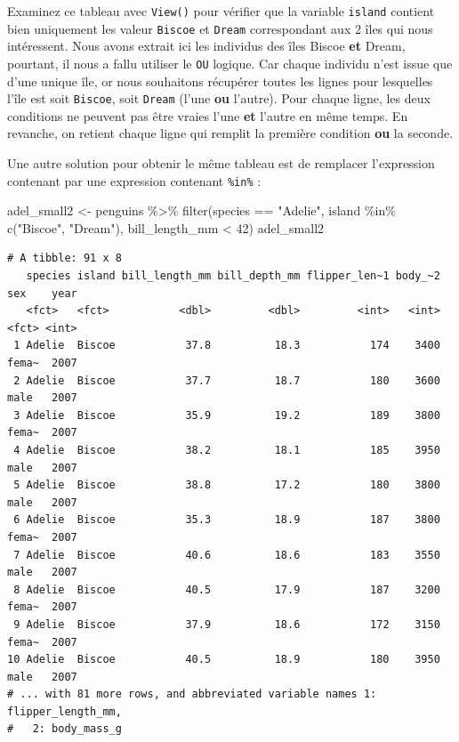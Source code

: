 \documentclass[
  letterpaper,
  DIV=11,
  numbers=noendperiod]{scrreprt}
\newenvironment{Shaded}{\begin{snugshade}}{\end{snugshade}}
\newcommand{\DecValTok}[1]{\textcolor[rgb]{0.68,0.00,0.00}{#1}}
\newcommand{\FunctionTok}[1]{\textcolor[rgb]{0.28,0.35,0.67}{#1}}
\newcommand{\NormalTok}[1]{\textcolor[rgb]{0.00,0.23,0.31}{#1}}
\newcommand{\OtherTok}[1]{\textcolor[rgb]{0.00,0.23,0.31}{#1}}
\newcommand{\SpecialCharTok}[1]{\textcolor[rgb]{0.37,0.37,0.37}{#1}}
\newcommand{\StringTok}[1]{\textcolor[rgb]{0.13,0.47,0.30}{#1}}
\begin{document}
Examinez ce tableau avec \texttt{View()} pour vérifier que la variable
\texttt{island} contient bien uniquement les valeur \texttt{Biscoe} et
\texttt{Dream} correspondant aux 2 îles qui nous intéressent. Nous avons
extrait ici les individus des îles Biscoe \textbf{et} Dream, pourtant,
il nous a fallu utiliser le \texttt{OU} logique. Car chaque individu
n'est issue que d'une unique île, or nous souhaitons récupérer toutes
les lignes pour lesquelles l'île est soit \texttt{Biscoe}, soit
\texttt{Dream} (l'une \textbf{ou} l'autre). Pour chaque ligne, les deux
conditions ne peuvent pas être vraies l'une \textbf{et} l'autre en même
temps. En revanche, on retient chaque ligne qui remplit la première
condition \textbf{ou} la seconde.

Une autre solution pour obtenir le même tableau est de remplacer
l'expression contenant \texttt{\textbar{}} par une expression contenant
\texttt{\%in\%} :

\begin{Shaded}
\begin{Highlighting}[]
\NormalTok{adel\_small2 }\OtherTok{\textless{}{-}}\NormalTok{ penguins }\SpecialCharTok{\%\textgreater{}\%} 
  \FunctionTok{filter}\NormalTok{(species }\SpecialCharTok{==} \StringTok{"Adelie"}\NormalTok{, }
\NormalTok{         island }\SpecialCharTok{\%in\%} \FunctionTok{c}\NormalTok{(}\StringTok{"Biscoe"}\NormalTok{, }\StringTok{"Dream"}\NormalTok{), }
\NormalTok{         bill\_length\_mm }\SpecialCharTok{\textless{}} \DecValTok{42}\NormalTok{)}
\NormalTok{adel\_small2}
\end{Highlighting}
\end{Shaded}

\begin{verbatim}
# A tibble: 91 x 8
   species island bill_length_mm bill_depth_mm flipper_len~1 body_~2 sex    year
   <fct>   <fct>           <dbl>         <dbl>         <int>   <int> <fct> <int>
 1 Adelie  Biscoe           37.8          18.3           174    3400 fema~  2007
 2 Adelie  Biscoe           37.7          18.7           180    3600 male   2007
 3 Adelie  Biscoe           35.9          19.2           189    3800 fema~  2007
 4 Adelie  Biscoe           38.2          18.1           185    3950 male   2007
 5 Adelie  Biscoe           38.8          17.2           180    3800 male   2007
 6 Adelie  Biscoe           35.3          18.9           187    3800 fema~  2007
 7 Adelie  Biscoe           40.6          18.6           183    3550 male   2007
 8 Adelie  Biscoe           40.5          17.9           187    3200 fema~  2007
 9 Adelie  Biscoe           37.9          18.6           172    3150 fema~  2007
10 Adelie  Biscoe           40.5          18.9           180    3950 male   2007
# ... with 81 more rows, and abbreviated variable names 1: flipper_length_mm,
#   2: body_mass_g
\end{verbatim}
\end{document}
